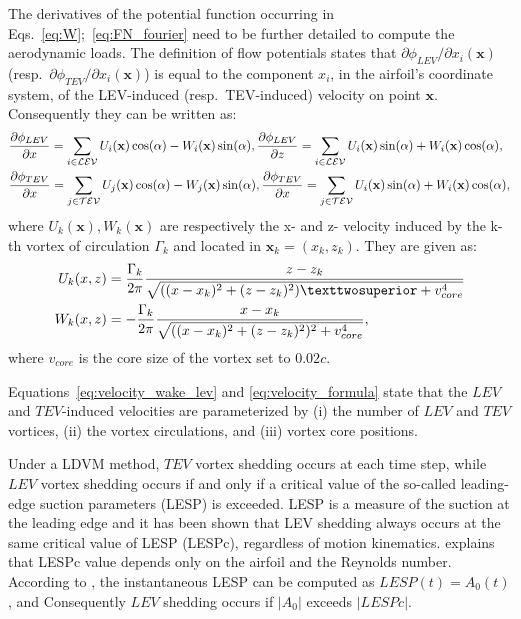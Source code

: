 \documentclass[a4paper,12pt]{article}
\begin{document}
The derivatives of the potential function occurring in Eqs.~\ref{eq:W};~\ref{eq:FN_fourier} need to be further detailed to compute the aerodynamic loads.
The definition of flow potentials states that $\partial \phi_{LEV}/\partial x_i(\textbf{x})$ (resp.~$\partial \phi_{TEV}/\partial x_i(\textbf{x})$) is equal to the component $x_i$, in the airfoil's coordinate system,  of the LEV-induced (resp.~TEV-induced) velocity on point $\textbf{x}$.
Consequently they can be written as:
\begin{align}
  &\frac{\partial \phi_{LEV}}{\partial x}=\sum_{i\in \mathcal{LEV}} U_i(\mathbf{x})\cos(\alpha)- W_i(\mathbf{x})\sin(\alpha),
  \frac{\partial \phi_{LEV}}{\partial z}=\sum_{i\in \mathcal{LEV}} U_i(\mathbf{x})\sin(\alpha)+ W_i(\mathbf{x})\cos(\alpha),\notag\\
  &\frac{\partial \phi_{TEV}}{\partial x}=\sum_{j\in \mathcal{TEV}} U_j(\mathbf{x})\cos(\alpha)- W_j(\mathbf{x})\sin(\alpha),
  \frac{\partial \phi_{TEV}}{\partial x}=\sum_{j\in \mathcal{TEV}} U_i(\mathbf{x})\sin(\alpha)+ W_i(\mathbf{x})\cos(\alpha),
  \label{eq:velocity_wake_lev}
\end{align} 
where $U_k(\textbf{x}),W_k(\textbf{x})$ are respectively the x- and z- velocity induced by the k-th vortex of circulation $\Gamma_k$ and located in $\textbf{x}_k=(x_k,z_k)$. 
They are given as:
\begin{align}
U_k(x,z) &= \frac{\Gamma_k}{2\pi} \frac{z - z_k}{\sqrt{((x - x_k)^2 + (z - z_k)^2)² + v_{core}^4}} \notag\\
W_k(x,z) &= -\frac{\Gamma_k}{2\pi} \frac{x - x_k}{\sqrt{((x - x_k)^2 + (z - z_k)^2)^2 + v_{core}^4}},
\label{eq:velocity_formula}
\end{align}
where $v_{core}$ is the core size of the vortex set to $0.02 c$.

Equations~\ref{eq:velocity_wake_lev} and \ref{eq:velocity_formula} state that the $LEV$ and $TEV$-induced velocities are parameterized by (i) the number of $LEV$ and $TEV$ vortices, (ii) the vortex circulations,  and (iii) vortex core positions.

Under a LDVM method, $TEV$ vortex shedding occurs at each time step, while $LEV$ vortex shedding  occurs if and only if a critical value of the so-called leading-edge suction parameters (LESP) is exceeded.
LESP is a  measure of the suction at the leading edge and it has been shown \citep{ramesh_unsteady_2013,ramesh2011augmentation} that LEV shedding always occurs at the same critical value of LESP (LESPc), regardless of motion kinematics.
\cite{ramesh2014discrete} explains that LESPc value depends only on the airfoil and the Reynolds number.
According to \cite{ramesh2014discrete}, the instantaneous LESP can be computed as $LESP(t)=A_0(t)$, and Consequently $LEV$ shedding  occurs if $|A_0|$ exceeds $|LESPc|$.
\end{document}
